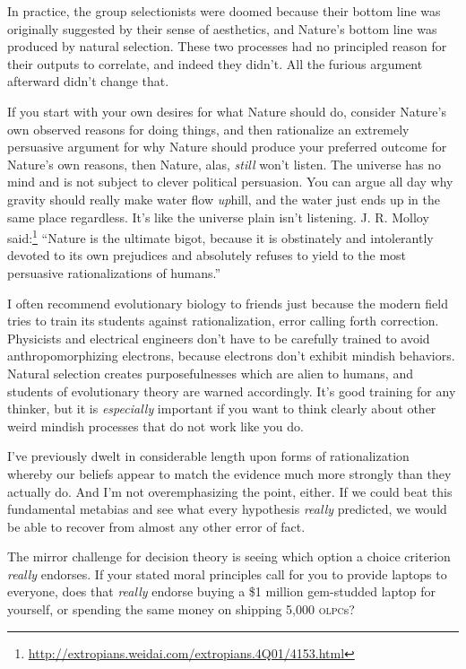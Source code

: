 {{
 In practice, the group selectionists were doomed because their
bottom line was originally suggested by their sense of aesthetics, and
Nature's bottom line was produced by natural selection.
These two processes had no principled reason for their outputs to
correlate, and indeed they didn't. All the furious
argument afterward didn't change that.}

{
 If you start with your own desires for what Nature should do,
consider Nature's own observed reasons for doing
things, and then rationalize an extremely persuasive argument for why
Nature should produce your preferred outcome for
Nature's own reasons, then Nature, alas, \textit{still}
won't listen. The universe has no mind and is not
subject to clever political persuasion. You can argue all day why
gravity should really make water flow \textit{up}hill, and the water
just ends up in the same place regardless. It's like
the universe plain isn't listening. J. R. Molloy said:\footnote{\url{http://extropians.weidai.com/extropians.4Q01/4153.html}}
``Nature is the ultimate bigot, because it is
obstinately and intolerantly devoted to its own prejudices and
absolutely refuses to yield to the most persuasive rationalizations of
humans.''}

{
 I often recommend evolutionary biology to friends just because the
modern field tries to train its students against rationalization, error
calling forth correction. Physicists and electrical engineers
don't have to be carefully trained to avoid
anthropomorphizing electrons, because electrons don't
exhibit mindish behaviors. Natural selection creates purposefulnesses
which are alien to humans, and students of evolutionary theory are
warned accordingly. It's good training for any thinker,
but it is \textit{especially} important if you want to think clearly
about other weird mindish processes that do not work like you do.}

\myendsectiontext


\bigskip


{
 I've previously dwelt in considerable length upon
forms of rationalization whereby our beliefs appear to match the
evidence much more strongly than they actually do. And
I'm not overemphasizing the point, either. If we could
beat this fundamental metabias and see what every hypothesis
\textit{really} predicted, we would be able to recover from almost any
other error of fact. }

{
 The mirror challenge for decision theory is seeing which option a
choice criterion \textit{really} endorses. If your stated moral
principles call for you to provide laptops to everyone, does that
\textit{really} endorse buying a \$1 million gem-studded laptop for
yourself, or spending the same money on shipping 5,000 \textsc{olpc}s?}

}
